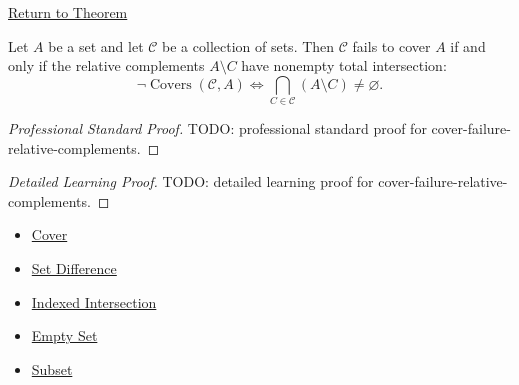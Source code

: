 \newpage
{}
\label{prf:cover-failure-relative-complements}

\begin{remark*}[Return]
\hyperref[thm:cover-failure-relative-complements]{Return to Theorem}
\end{remark*}

\begin{theorem*}
Let $A$ be a set and let $\mathcal{C}$ be a collection of sets. Then
$\mathcal{C}$ fails to cover $A$ if and only if the relative complements
$A\setminus C$ have nonempty total intersection:
\[
\neg\operatorname{Covers}(\mathcal{C},A)
\iff
\bigcap_{C\in\mathcal{C}}(A\setminus C)\neq\varnothing.
\]
\end{theorem*}

\begin{proof}[Professional Standard Proof]
\LRAProofBodyStart
TODO: professional standard proof for cover-failure-relative-complements.
\end{proof}

\begin{proof}[Detailed Learning Proof]
\LRAProofBodyStart
TODO: detailed learning proof for cover-failure-relative-complements.
\end{proof}

\begin{remark*}
\end{remark*}

\begin{dependencies}
\begin{itemize}
  \item \hyperref[def:cover-full]{Cover}
  \item \hyperref[def:set-difference]{Set Difference}
  \item \hyperref[def:indexed-intersection]{Indexed Intersection}
  \item \hyperref[def:empty-set]{Empty Set}
  \item \hyperref[def:subset]{Subset}
\end{itemize}
\end{dependencies}

\clearpage
